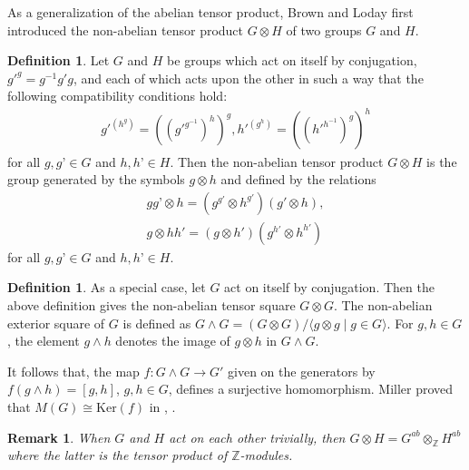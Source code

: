 \documentclass[preprint,sort&compress,12pt]{elsarticle}
\newtheorem{remark}[theorem]{Remark}
\numberwithin{equation}{section}
\theoremstyle{definition}
\newtheorem{definition}[theorem]{Definition}
\begin{document}
As a generalization of the abelian tensor product, Brown and Loday \cite{Brown1987} first introduced the non-abelian tensor product $G \otimes H$ of two groups $G$ and $H$. 
\begin{definition} \cite[Definition 2.1]{Brown1987} \label{definition: group tensor product and exterior product}
    Let $G$ and $H$ be groups which act on itself by conjugation, $g'^g=g^{-1}g'g$, 
and each of which acts upon the other in such a way that the following compatibility conditions hold: 
\begin{align*}
    g'^{(h^g)} = ((g'^{g^{-1}})^h)^g,
    h'^{(g^h)}=((h'^{h^{-1}})^g)^h 
\end{align*}
for all $g, g’ \in G$ and $h, h’ \in H$. Then the non-abelian tensor product $G \otimes H$ is the group generated by the symbols $g \otimes h$ and defined by the relations 
\begin{align*}
    gg’ \otimes h= (g^{g'} \otimes h^{g'})(g' \otimes h), \\ 
    g \otimes hh'= (g \otimes h')(g^{h'} \otimes h^{h'}) 
\end{align*}
for all $g, g’ \in G$ and $h, h’ \in H$. 
\end{definition}
\begin{definition} \label{definition: group exterior square}
    As a special case, let $G$ act on itself by conjugation. Then the above definition gives the non-abelian tensor square $G \otimes G$. The non-abelian exterior square of $G$ is defined as $G \wedge G=(G \otimes G) / \langle g \otimes g\mid g \in G\rangle$. For $g,h \in G$, the element $g \wedge h$ denotes the image of $g \otimes h$ in $G \wedge G$.
\end{definition}
It follows that, the map $f: G \wedge G \to G'$ given on the generators by $f(g \wedge h)=[g,h]$, $g,h \in G$, defines a surjective homomorphism.  Miller proved that $M(G) \cong \mathrm{Ker}(f)$ in \cite[Theorem 3]{Mill1952}, .
\begin{remark} \cite[Proposition 2.4]{Brown1987} \label{group tensor product and non-abelian tensor product are same}
    When $G$ and $H$ act on each other trivially, then $G \otimes H = G^{ab} \otimes _{\mathbb{Z}}H^{ab}$ where the latter is the tensor product of $\mathbb{Z}$-modules. 
\end{remark}
\end{document}

